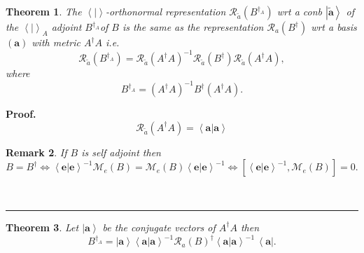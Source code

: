 \documentclass[aps,preprint]{revtex4}%
\newtheorem{theorem}{Theorem}
\newtheorem{remark}[theorem]{Remark}
\newenvironment{proof}[1][Proof]{\noindent\textbf{#1.} }{\ \rule{0.5em}{0.5em}}
\begin{document}
\begin{theorem}
The $\left\langle \left.  {}\right\vert \right\rangle $-orthonormal
representation $\mathcal{R}_{\widetilde{a}}\left(  B^{\dagger_{A}}\right)  $
wrt a conb $\left\vert \widetilde{\mathbf{a}}\right\rangle $ of the
$\left\langle \left.  {}\right\vert \right\rangle _{A}$ adjoint $B^{\dagger
_{A}}$of $B$ is the same as the representation $\mathcal{R}_{a}\left(
B^{\dagger}\right)  $ wrt a basis $\left(  \mathbf{a}\right)  $ with metric
$A^{\dagger}A$ i.e.%
\begin{equation}
\mathcal{R}_{\widetilde{a}}\left(  B^{\dagger_{A}}\right)  =\mathcal{R}%
_{\widetilde{a}}\left(  A^{\dagger}A\right)  ^{-1}\mathcal{R}_{\widetilde{a}%
}\left(  B^{\dagger}\right)  \mathcal{R}_{\widetilde{a}}\left(  A^{\dagger
}A\right)  ,
\end{equation}
where
\begin{equation}
B^{\dagger_{A}}=\left(  A^{\dagger}A\right)  ^{-1}B^{\dagger}\left(
A^{\dagger}A\right)  .
\end{equation}

\end{theorem}

\begin{proof}%
\begin{equation}
\mathcal{R}_{\widetilde{a}}\left(  A^{\dagger}A\right)  =\left\langle \left.
\mathbf{a}\right\vert \mathbf{a}\right\rangle
\end{equation}


\begin{remark}
If $B$ is self adjoint then
\begin{equation}
B=B^{\dagger}\Leftrightarrow\left\langle \left.  \mathbf{e}\right\vert
\mathbf{e}\right\rangle ^{-1}\mathcal{M}_{e}\left(  B\right)  =\mathcal{M}%
_{e}\left(  B\right)  \left\langle \left.  \mathbf{e}\right\vert
\mathbf{e}\right\rangle ^{-1}\Leftrightarrow\left[  \left\langle \left.
\mathbf{e}\right\vert \mathbf{e}\right\rangle ^{-1},\mathcal{M}_{e}\left(
B\right)  \right]  =0.
\end{equation}

\end{remark}
\end{proof}

\begin{theorem}
Let $\left\vert \mathbf{a}\right\rangle $ be the conjugate vectors of
$A^{\dagger}A$ then%
\begin{equation}
B^{\dagger_{A}}=\left\vert \mathbf{a}\right\rangle \left\langle \left.
\mathbf{a}\right\vert \mathbf{a}\right\rangle ^{-1}\mathcal{R}_{a}\left(
B\right)  ^{\dagger}\left\langle \left.  \mathbf{a}\right\vert \mathbf{a}%
\right\rangle ^{-1}\,\left\langle \mathbf{a}\right\vert .
\end{equation}

\end{theorem}
\end{document}
